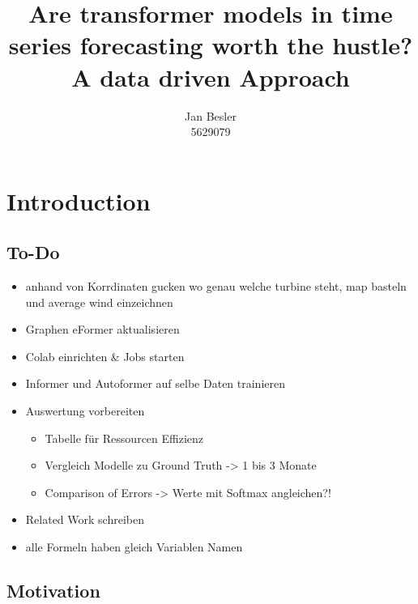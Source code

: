 \documentclass{article}
\title{Are transformer models in time series forecasting worth the hustle? \\
        \Large A data driven Approach}
\author{Jan Besler \\
        5629079}
\begin{document}
\maketitle

\tableofcontents

\newpage

\section{Introduction}

\subsection{To-Do}

\begin{itemize}
   \item anhand von Korrdinaten gucken wo genau welche turbine steht, map basteln und average wind einzeichnen
   \item Graphen eFormer aktualisieren
   \item Colab einrichten \& Jobs starten
   \item Informer und Autoformer auf selbe Daten trainieren
   \item Auswertung vorbereiten
   \begin{itemize}
       \item Tabelle für Ressourcen Effizienz
       \item Vergleich Modelle zu Ground Truth -> 1 bis 3 Monate
       \item Comparison of Errors -> Werte mit Softmax angleichen?!
   \end{itemize}
   \item Related Work schreiben
   \item alle Formeln haben gleich Variablen Namen
\end{itemize}

\subsection{Motivation}
\end{document}
